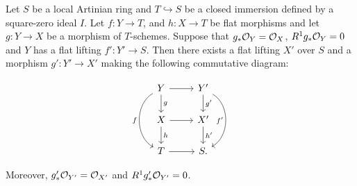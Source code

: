 \begin{proposition}\label{push-lift}
	Let $S$ be a local Artinian ring and $T \hookrightarrow S$ be a closed immersion defined by a square-zero ideal $I$.  Let $f\colon Y \to T$, and $h\colon X \to T$ be flat morphisms and let $g\colon Y \to X$ be a morphism of $T$-schemes. 
	Suppose that $g_{*} \ox[Y]=\ox$, $R^{1}g_{*} \ox[Y] = 0$ and $Y$ has a flat lifting $f' \colon Y' \to S$. Then there exists a flat lifting $X'$ over $S$ and a morphism $g' \colon Y' \to X'$ making the following commutative diagram:
	
	\[\begin{tikzcd}
	Y \arrow[r] \arrow[d, "g"]  \arrow[bend right=60,swap, "f"]{dd}
	& Y' \arrow[d, "g'"] \arrow[bend left=60,swap, "f'"]{dd} \\
	X \arrow[d, "h"] \arrow[r] & X' \arrow[d, "h'"] \\
	T \arrow[r]                        & S    .                     
	\end{tikzcd}\]
	
	Moreover,  $g'_{*} \ox[Y']=\ox[X']$ and $R^{1}g'_{*} \ox[Y'] = 0$.
\end{proposition}

